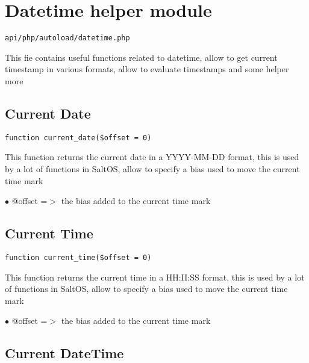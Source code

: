 \documentclass[a4paper]{book}
\begin{document}
\hypertarget{toc72}{}
\section{Datetime helper module}

\begin{lstlisting}
api/php/autoload/datetime.php
\end{lstlisting}

This fie contains useful functions related to datetime, allow to get current timestamp in various
formats, allow to evaluate timestamps and some helper more

\hypertarget{toc73}{}
\subsection{Current Date}

\begin{lstlisting}
function current_date($offset = 0)
\end{lstlisting}

This function returns the current date in a YYYY-MM-DD format, this is used
by a lot of functions in SaltOS, allow to specify a bias used to move the
current time mark

\begin{compactitem}
\item[\color{myblue}$\bullet$] @offset =$>$ the bias added to the current time mark
\end{compactitem}

\hypertarget{toc74}{}
\subsection{Current Time}

\begin{lstlisting}
function current_time($offset = 0)
\end{lstlisting}

This function returns the current time in a HH:II:SS format, this is used
by a lot of functions in SaltOS, allow to specify a bias used to move the
current time mark

\begin{compactitem}
\item[\color{myblue}$\bullet$] @offset =$>$ the bias added to the current time mark
\end{compactitem}

\hypertarget{toc75}{}
\subsection{Current DateTime}
\end{document}
